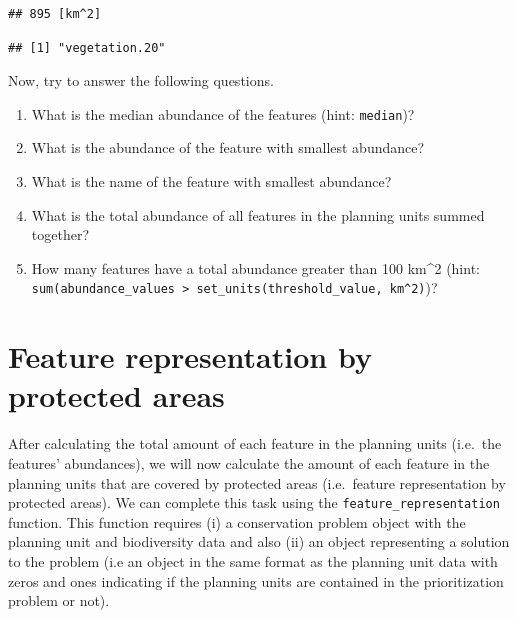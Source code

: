 \documentclass[12pt,]{book}
\newenvironment{Shaded}{\begin{snugshade}}{\end{snugshade}}
\newcommand{\KeywordTok}[1]{\textcolor[rgb]{0.13,0.29,0.53}{\textbf{#1}}}
\newcommand{\CommentTok}[1]{\textcolor[rgb]{0.56,0.35,0.01}{\textit{#1}}}
\newcommand{\OperatorTok}[1]{\textcolor[rgb]{0.81,0.36,0.00}{\textbf{#1}}}
\newcommand{\NormalTok}[1]{#1}
\providecommand{\tightlist}{%
  \setlength{\itemsep}{0pt}\setlength{\parskip}{0pt}}
\let\BeginKnitrBlock\begin \let\EndKnitrBlock\end
\begin{document}
\begin{verbatim}
## 895 [km^2]
\end{verbatim}

\begin{Shaded}
\end{Shaded}

\begin{verbatim}
## [1] "vegetation.20"
\end{verbatim}

Now, try to answer the following questions.

\BeginKnitrBlock{rmdquestion}
\begin{enumerate}
\def\labelenumi{\arabic{enumi}.}
\tightlist
\item
  What is the median abundance of the features (hint: \texttt{median})?
\item
  What is the abundance of the feature with smallest abundance?
\item
  What is the name of the feature with smallest abundance?
\item
  What is the total abundance of all features in the planning units
  summed together?
\item
  How many features have a total abundance greater than 100 km\^{}2
  (hint:
  \texttt{sum(abundance\_values\ \textgreater{}\ set\_units(threshold\_value,\ km\^{}2)})?
\end{enumerate}
\EndKnitrBlock{rmdquestion}

\section{Feature representation by protected
areas}\label{feature-representation-by-protected-areas}

After calculating the total amount of each feature in the planning units
(i.e.~the features' abundances), we will now calculate the amount of
each feature in the planning units that are covered by protected areas
(i.e.~feature representation by protected areas). We can complete this
task using the \texttt{feature\_representation} function. This function
requires (i) a conservation problem object with the planning unit and
biodiversity data and also (ii) an object representing a solution to the
problem (i.e an object in the same format as the planning unit data with
zeros and ones indicating if the planning units are contained in the
prioritization problem or not).
\end{document}
